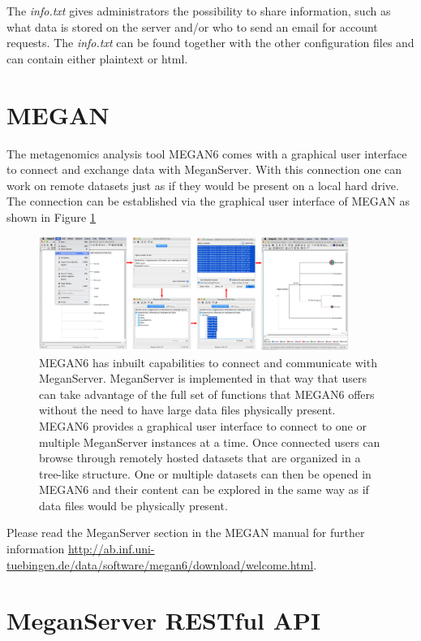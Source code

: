 \documentclass[11pt]{article}
\begin{document}
The \textit{info.txt} gives administrators the possibility to share information, such as what data is stored on the server and/or who to send an email for account requests. The \textit{info.txt} can be found together with the other configuration files and can contain either plaintext or html.

\section{MEGAN}

The metagenomics analysis tool MEGAN6 comes with a graphical user interface to connect and exchange data with MeganServer. With this connection one can work on remote datasets just as if they would be present on a local hard drive. The connection can be established via the graphical user interface of MEGAN as shown in Figure \ref{fig:megan}

\begin{figure}[h!]

  \centering
    \includegraphics[width=0.9\textwidth]{meganConnectMeganServer.pdf}
    \caption{MEGAN6 has inbuilt capabilities to connect and communicate with MeganServer. MeganServer is implemented in that way that users can take advantage of the full set of functions that MEGAN6 offers without the need to have large data files physically present. MEGAN6 provides a graphical user interface to connect to one or multiple MeganServer instances at a time. Once connected users can browse through remotely hosted datasets that are organized in a tree-like structure. One or multiple datasets can then be opened in MEGAN6 and their content can be explored in the same way as if data files would be physically present.}
      \label{fig:megan}
\end{figure}




Please read the MeganServer section in the MEGAN manual for further information \url{http://ab.inf.uni-tuebingen.de/data/software/megan6/download/welcome.html}.


\section{MeganServer RESTful API}
\end{document}
